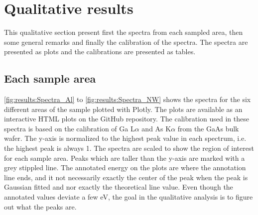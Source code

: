 \section{Qualitative results}
\label{sec:results:qualitative}

This qualitative section present first the spectra from each sampled area, then some general remarks and finally the calibration of the spectra. The spectra are presented as plots and the calibrations are presented as tables.


\subsection{Each sample area}
\label{sec:results:qualitative:each_sample_area}

\cref{fig:results:Spectra_Al} to \cref{fig:results:Spectra_NW} shows the spectra for the six different areas of the sample plotted with Plotly.
The plots are available as an interactive HTML plots on the GitHub repository.
The calibration used in these spectra is based on the calibration of Ga L$\alpha$ and As K$\alpha$ from the GaAs bulk wafer.
The y-axis is normalized to the highest peak value in each spectrum, i.e. the highest peak is always 1. %
The spectra are scaled to show the region of interest for each sample area.
Peaks which are taller than the y-axis are marked with a grey stippled line.
The annotated energy on the plots are where the annotation line ends, and it not necessarily exactly the center of the peak when the peak is Gaussian fitted and nor exactly the theoretical line value.
Even though the annotated values deviate a few eV, the goal in the qualitative analysis is to figure out what the peaks are.



